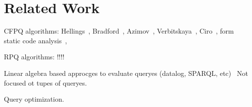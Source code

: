 \section{Related Work}

CFPQ algorithms: Hellings~\cite{!!!}, Bradford~\cite{!!!}, Azimov~\cite{!!!}, Verbitskaya~\cite{!!!}, Ciro~\cite{!!!}, form static code analysis~\cite{!!!}, 

RPQ algorithms: !!!!~\cite{!!!}

Linear algebra based approcges to evaluate queryes (datalog, SPARQL, etc)~\cite{!!!} Not focused ot tupes of queryes.

Query optimization.
